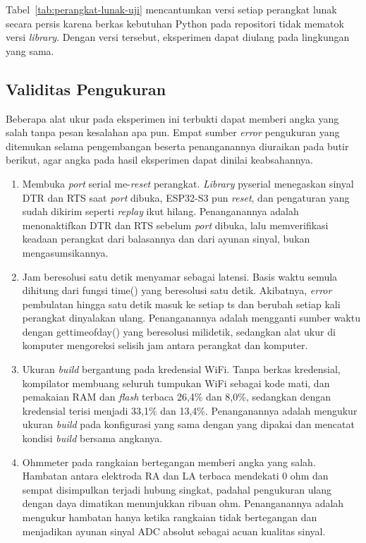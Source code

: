 Tabel~\ref{tab:perangkat-lunak-uji} mencantumkan versi setiap perangkat lunak secara persis karena berkas kebutuhan Python pada repositori tidak mematok versi \textit{library}. Dengan versi tersebut, eksperimen dapat diulang pada lingkungan yang sama.

\subsection{Validitas Pengukuran}

Beberapa alat ukur pada eksperimen ini terbukti dapat memberi angka yang salah tanpa pesan kesalahan apa pun. Empat sumber \textit{error} pengukuran yang ditemukan selama pengembangan beserta penanganannya diuraikan pada butir berikut, agar angka pada hasil eksperimen dapat dinilai keabsahannya.
\begin{enumerate}
  \item Membuka \textit{port} serial me-\textit{reset} perangkat. \textit{Library} pyserial menegaskan sinyal DTR dan RTS saat \textit{port} dibuka, ESP32-S3 pun \textit{reset}, dan pengaturan yang sudah dikirim seperti \textit{replay} ikut hilang. Penanganannya adalah menonaktifkan DTR dan RTS sebelum \textit{port} dibuka, lalu memverifikasi keadaan perangkat dari balasannya dan dari ayunan sinyal, bukan mengasumsikannya.
  \item Jam beresolusi satu detik menyamar sebagai latensi. Basis waktu semula dihitung dari fungsi time() yang beresolusi satu detik. Akibatnya, \textit{error} pembulatan hingga satu detik masuk ke setiap ts dan berubah setiap kali perangkat dinyalakan ulang. Penanganannya adalah mengganti sumber waktu dengan gettimeofday() yang beresolusi milidetik, sedangkan alat ukur di komputer mengoreksi selisih jam antara perangkat dan komputer.
  \item Ukuran \textit{build} bergantung pada kredensial WiFi. Tanpa berkas kredensial, kompilator membuang seluruh tumpukan WiFi sebagai kode mati, dan pemakaian RAM dan \textit{flash} terbaca 26,4\% dan 8,0\%, sedangkan dengan kredensial terisi menjadi 33,1\% dan 13,4\%. Penanganannya adalah mengukur ukuran \textit{build} pada konfigurasi yang sama dengan yang dipakai dan mencatat kondisi \textit{build} bersama angkanya.
  \item Ohmmeter pada rangkaian bertegangan memberi angka yang salah. Hambatan antara elektroda RA dan LA terbaca mendekati 0 ohm dan sempat disimpulkan terjadi hubung singkat, padahal pengukuran ulang dengan daya dimatikan menunjukkan ribuan ohm. Penanganannya adalah mengukur hambatan hanya ketika rangkaian tidak bertegangan dan menjadikan ayunan sinyal ADC absolut sebagai acuan kualitas sinyal.
\end{enumerate}


